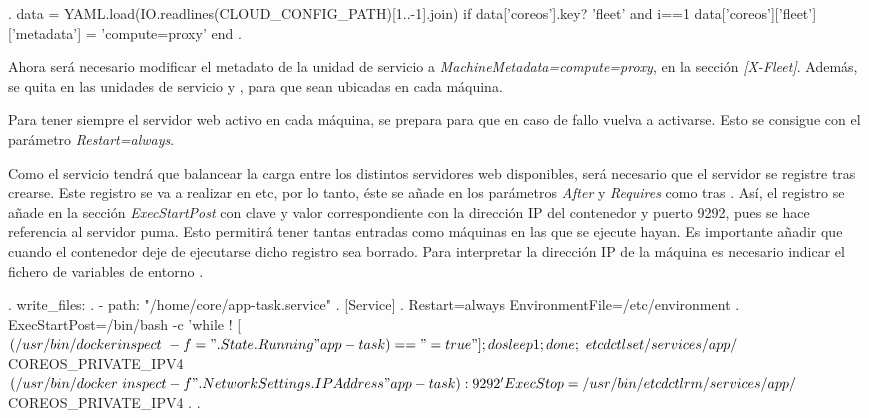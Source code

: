 \begin{codelisting}
\label{code:vagrantfile2}
\begin{code}
.
data = YAML.load(IO.readlines(CLOUD_CONFIG_PATH)[1..-1].join)
if data['coreos'].key? 'fleet' and i==1
 data['coreos']['fleet']['metadata'] = 'compute=proxy'
end
.
\end{code}
\end{codelisting}

Ahora será necesario modificar el metadato de la unidad de servicio  a \textit{MachineMetadata=compute=proxy}, en la sección \textit{[X-Fleet]}. Además, se quita  en las unidades de servicio  y , para que sean ubicadas en cada máquina.

Para tener siempre el servidor web  activo en cada máquina, se prepara para que en caso de fallo vuelva a activarse. Esto se consigue con el parámetro \textit{Restart=always}.

Como el servicio  tendrá que balancear la carga entre los distintos servidores web disponibles, será necesario que el servidor  se registre tras crearse. Este registro se va a realizar en etc, por lo tanto, éste se añade en los parámetros \textit{After} y \textit{Requires} como  tras . Así, el registro se añade en la sección \textit{ExecStartPost} con clave  y valor correspondiente con la dirección IP del contenedor y puerto 9292, pues se hace referencia al servidor puma. Esto permitirá tener tantas entradas  como máquinas en las que se ejecute hayan. Es importante añadir que cuando el contenedor deje de ejecutarse dicho registro sea borrado. Para interpretar la dirección IP de la máquina es necesario indicar el fichero de variables de entorno . 

\begin{codelisting}
\label{code:execstartpost-app-task}
\begin{code}
.
write_files:
.
  - path: "/home/core/app-task.service"
    .
    [Service] 
      .
      Restart=always     
      EnvironmentFile=/etc/environment
      .
      ExecStartPost=/bin/bash -c 'while ! [ $(/usr/bin/docker inspect \
      -f ="{{.State.Running}}" app-task) == "=true" ]; do sleep 1; done; \
      etcdctl set /services/app/${COREOS_PRIVATE_IPV4} $(/usr/bin/docker \
      inspect -f "{{ .NetworkSettings.IPAddress }}" app-task):9292'
      ExecStop=/usr/bin/etcdctl rm /services/app/${COREOS_PRIVATE_IPV4}
      .
.
\end{code}
\end{codelisting}

